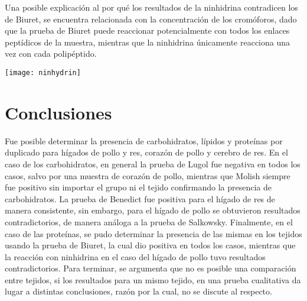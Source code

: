 \documentclass[fleqn,10pt]{SelfArx}
\begin{document}
	Una posible explicaci\'on al por qu\'e los resultados de la ninhidrina contradicen los de Biuret, se encuentra relacionada con la concentraci\'on de los crom\'oforos, dado que la prueba de Biuret puede reaccionar potencialmente con todos los enlaces pept\'idicos de la muestra, mientras que la ninhidrina \'unicamente reacciona una vez con cada polip\'eptido.
	\begin{scheme}[h]
		\centering
		\texttt{[image: ninhydrin]}
		\caption{Reacci\'on de los amino\'acidos con la ninhidrina.}
		\label{sch: ninhidrina}
	\end{scheme}

	\newpage

\section{Conclusiones}
	Fue posible determinar la presencia de carbohidratos, l\'ipidos y prote\'inas por duplicado para h\'igados de pollo y res, coraz\'on de pollo y cerebro de res. En el caso de los carbohidratos, en general la prueba de Lugol fue negativa en todos los casos, salvo por una muestra de coraz\'on de pollo, mientras que Molish siempre fue positivo sin importar el grupo ni el tejido confirmando la presencia de carbohidratos. La prueba de Benedict fue positiva para el h\'igado de res de manera consistente, sin embargo, para el h\'igado de pollo se obtuvieron resultados contradictorios, de manera an\'aloga a la prueba de Salkowsky. Finalmente, en el caso de las prote\'inas, se pudo determinar la presencia de las mismas en los tejidos usando la prueba de Biuret, la cual dio positiva en todos los casos, mientras que la reacci\'on con ninhidrina en el caso del h\'igado de pollo tuvo resultados contradictorios. Para terminar, se argumenta que no es posible una comparaci\'on entre tejidos, si los resultados para un mismo tejido, en una prueba cualitativa da lugar a distintas conclusiones, raz\'on por la cual, no se discute al respecto.
	



\end{document}
